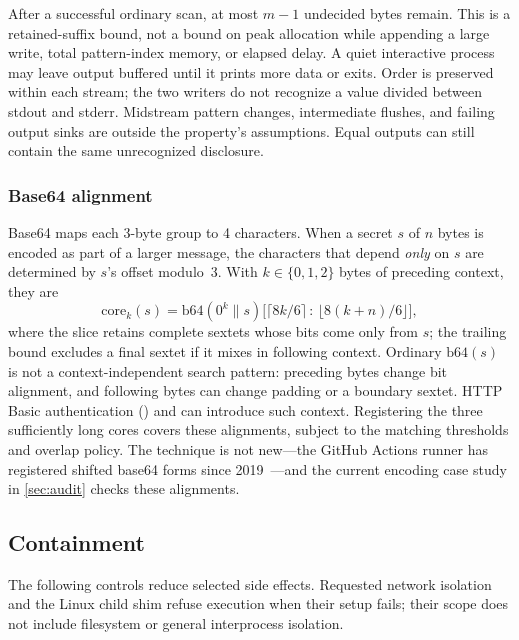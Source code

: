 \documentclass[10pt,twocolumn]{article}
\newcommand{\code}[1]{\textup{\texttt{\detokenize{#1}}}}
\begin{document}
After a successful ordinary scan, at most $m-1$ undecided bytes remain. This is
a retained-suffix bound, not a bound on peak allocation while appending a large
write, total pattern-index memory, or elapsed delay. A quiet interactive process
may leave output buffered until it prints more data or exits. Order is preserved
within each stream; the two writers do not recognize a value divided between
stdout and stderr. Midstream pattern changes, intermediate flushes, and failing
output sinks are outside the property's assumptions. Equal outputs can still
contain the same unrecognized disclosure.

\subsubsection{Base64 alignment}
\label{sec:align}
Base64 maps each 3-byte group to 4 characters. When a secret $s$ of $n$ bytes is
encoded as part of a larger message, the characters that depend \emph{only} on
$s$ are determined by $s$'s offset modulo~3. With $k \in \{0,1,2\}$ bytes of
preceding context, they are
\[
  \mathrm{core}_k(s) = \mathrm{b64}(0^k \| s)\big[\lceil 8k/6 \rceil \,:\, \lfloor 8(k+n)/6 \rfloor\big],
\]
where the slice retains complete sextets whose bits come only from $s$;
the trailing bound excludes a final sextet if it mixes in following context.
Ordinary $\mathrm{b64}(s)$ is not a context-independent search pattern:
preceding bytes change bit alignment, and following bytes can change padding
or a boundary sextet. HTTP Basic authentication (\code{user:token}) and
\code{printenv | base64} can introduce such context. Registering the three
sufficiently long cores covers these alignments, subject to the matching
thresholds and overlap policy. The technique is not new---the GitHub Actions
runner has registered shifted base64 forms since
2019~\citep{githubrunner2019encoders}---and the current encoding case study in
\cref{sec:audit} checks these alignments.

\subsection{Containment}
\label{sec:contain}

The following controls reduce selected side effects. Requested network isolation
and the Linux child shim refuse execution when their setup fails; their scope
does not include filesystem or general interprocess isolation.
\end{document}

